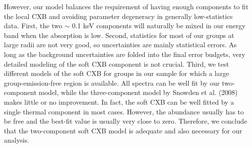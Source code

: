 \documentclass{aastex}
\begin{document}
However, our model balances the requirement of having enough components to fit the local
CXB and avoiding parameter degeneracy in generally low-statistics data. First, the two
$\sim$ 0.1 keV components will naturally be mixed in our energy band when the
absorption is low. Second,
statistics for most of our groups at large radii are not very good, so uncertainties
are mainly statistical errors. As long as the background uncertainties are folded
into the final error budgets, very detailed modeling of the soft CXB component
is not crucial. Third, we test different models of the soft CXB for groups in our sample
for which a large group-emission-free region is available. All spectra can be well
fit by our two-component model, while the three-component model by Snowden et al. (2008)
makes little or no improvement. In fact, the soft CXB can be well fitted by a single
thermal component in most cases. However, the abundance usually has to be free
and the best-fit value is usually very close to zero. Therefore, we conclude that
the two-component soft CXB model is adequate and also necessary for our analysis.
\end{document}
